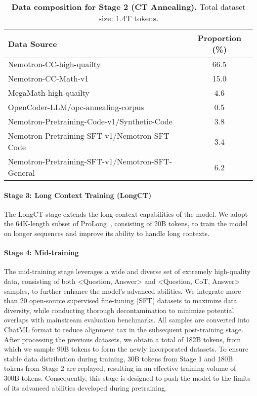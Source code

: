 \documentclass[]{bytedance_seed}
\newcommand{\1}{\mathbf{1}}
\begin{document}
\begin{table}[ht]
\small
\centering
\caption{\textbf{Data composition for Stage 2 (CT Annealing).} Total dataset size: 1.4T tokens.}
\label{tab:stage2_composition}
\begin{tabular}{l|c}
\toprule
\textbf{Data Source} & \textbf{Proportion (\%)} \\
\hline
Nemotron-CC-high-quailty & 66.5 \\
Nemotron-CC-Math-v1 & 15.0 \\
MegaMath-high-quailty & 4.6 \\
OpenCoder-LLM/opc-annealing-corpus & 0.5 \\
Nemotron-Pretraining-Code-v1/Synthetic-Code & 3.8 \\
Nemotron-Pretraining-SFT-v1/Nemotron-SFT-Code & 3.4 \\
Nemotron-Pretraining-SFT-v1/Nemotron-SFT-General & 6.2 \\

\bottomrule
\end{tabular}
\end{table}


\paragraph{Stage 3: Long Context Training (LongCT)}
The LongCT stage extends the long-context capabilities of the model. We adopt the 64K-length subset of ProLong~\cite{gao2024train}, consisting of 20B tokens, to train the model on longer sequences and improve its ability to handle long contexts.

\paragraph{Stage 4: Mid-training}
The mid-training stage leverages a wide and diverse set of extremely high-quality data, consisting of both <Question, Answer> and <Question, CoT, Answer> samples, to further enhance the model's advanced abilities. We integrate more than 20 open-source supervised fine-tuning (SFT) datasets to maximize data diversity, while conducting thorough decontamination to minimize potential overlaps with mainstream evaluation benchmarks. All samples are converted into ChatML format to reduce alignment tax in the subsequent post-training stage. After processing the previous datasets, we obtain a total of 182B tokens, from which we sample 90B tokens to form the newly incorporated datasets. To ensure stable data distribution during training, 30B tokens from Stage 1 and 180B tokens from Stage 2 are replayed, resulting in an effective training volume of 300B tokens. Consequently, this stage is designed to push the model to the limits of its advanced abilities developed during pretraining.
\end{document}
